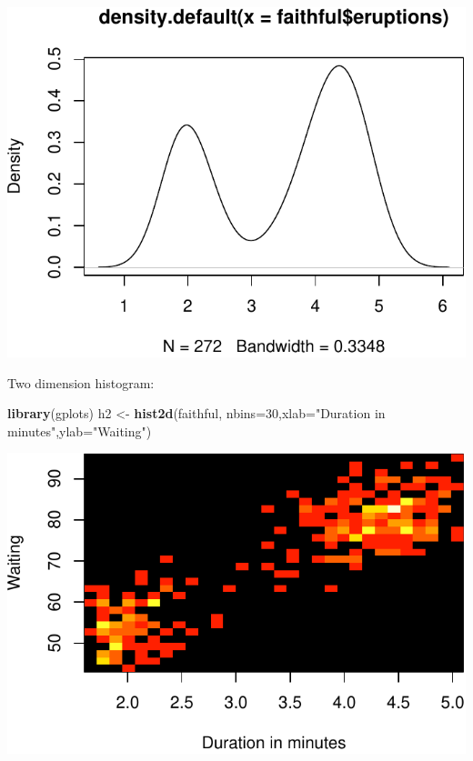 \documentclass[]{article}
\newenvironment{Shaded}{\begin{snugshade}}{\end{snugshade}}
\newcommand{\KeywordTok}[1]{\textcolor[rgb]{0.13,0.29,0.53}{\textbf{{#1}}}}
\newcommand{\DataTypeTok}[1]{\textcolor[rgb]{0.13,0.29,0.53}{{#1}}}
\newcommand{\DecValTok}[1]{\textcolor[rgb]{0.00,0.00,0.81}{{#1}}}
\newcommand{\StringTok}[1]{\textcolor[rgb]{0.31,0.60,0.02}{{#1}}}
\newcommand{\NormalTok}[1]{{#1}}
\numberwithin{equation}{section}
\begin{document}
\includegraphics{index_files/figure-latex/unnamed-chunk-108-1.pdf}

Two dimension histogram:

\begin{Shaded}
\begin{Highlighting}[]
\KeywordTok{library}\NormalTok{(gplots)}
\NormalTok{h2 <-}\StringTok{ }\KeywordTok{hist2d}\NormalTok{(faithful, }\DataTypeTok{nbins=}\DecValTok{30}\NormalTok{,}\DataTypeTok{xlab=}\StringTok{"Duration in minutes"}\NormalTok{,}\DataTypeTok{ylab=}\StringTok{"Waiting"}\NormalTok{)}
\end{Highlighting}
\end{Shaded}

\includegraphics{index_files/figure-latex/unnamed-chunk-109-1.pdf}
\end{document}

